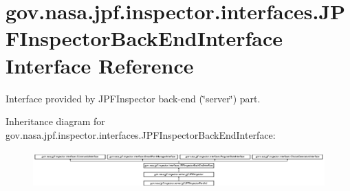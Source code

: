 \hypertarget{interfacegov_1_1nasa_1_1jpf_1_1inspector_1_1interfaces_1_1_j_p_f_inspector_back_end_interface}{}\section{gov.\+nasa.\+jpf.\+inspector.\+interfaces.\+J\+P\+F\+Inspector\+Back\+End\+Interface Interface Reference}
\label{interfacegov_1_1nasa_1_1jpf_1_1inspector_1_1interfaces_1_1_j_p_f_inspector_back_end_interface}


Interface provided by J\+P\+F\+Inspector back-\/end (\char`\"{}server\char`\"{}) part.  


Inheritance diagram for gov.\+nasa.\+jpf.\+inspector.\+interfaces.\+J\+P\+F\+Inspector\+Back\+End\+Interface\+:\begin{figure}[H]
\begin{center}
\leavevmode
\includegraphics[height=1.454545cm]{interfacegov_1_1nasa_1_1jpf_1_1inspector_1_1interfaces_1_1_j_p_f_inspector_back_end_interface}
\end{center}
\end{figure}
